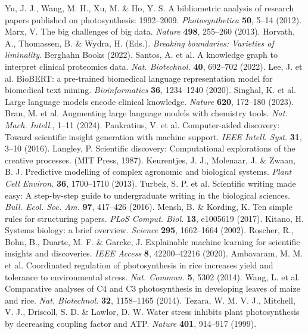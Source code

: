 \documentclass[12pt]{article}
\begin{document}
\begin{thebibliography}{39}
 Yu, J. J., Wang, M. H., Xu, M. \& Ho, Y. S. A bibliometric analysis of research papers published on photosynthesis: 1992--2009. \textit{Photosynthetica} \textbf{50}, 5--14 (2012).
 Marx, V. The big challenges of big data. \textit{Nature} \textbf{498}, 255--260 (2013).
 Horvath, A., Thomassen, B. \& Wydra, H. (Eds.). \textit{Breaking boundaries: Varieties of liminality}. Berghahn Books (2022).
 Santos, A. et al. A knowledge graph to interpret clinical proteomics data. \textit{Nat. Biotechnol.} \textbf{40}, 692--702 (2022).
 Lee, J. et al. BioBERT: a pre-trained biomedical language representation model for biomedical text mining. \textit{Bioinformatics} \textbf{36}, 1234--1240 (2020).
 Singhal, K. et al. Large language models encode clinical knowledge. \textit{Nature} \textbf{620}, 172--180 (2023).
 Bran, M. et al. Augmenting large language models with chemistry tools. \textit{Nat. Mach. Intell.}, 1--11 (2024).
 Pankratius, V. et al. Computer-aided discovery: Toward scientific insight generation with machine support. \textit{IEEE Intell. Syst.} \textbf{31}, 3--10 (2016).
 Langley, P. Scientific discovery: Computational explorations of the creative processes. (MIT Press, 1987).
 Keurentjes, J. J., Molenaar, J. \& Zwaan, B. J. Predictive modelling of complex agronomic and biological systems. \textit{Plant Cell Environ.} \textbf{36}, 1700--1710 (2013).
 Turbek, S. P. et al. Scientific writing made easy: A step-by-step guide to undergraduate writing in the biological sciences. \textit{Bull. Ecol. Soc. Am.} \textbf{97}, 417--426 (2016).
 Mensh, B. \& Kording, K. Ten simple rules for structuring papers. \textit{PLoS Comput. Biol.} \textbf{13}, e1005619 (2017).
 Kitano, H. Systems biology: a brief overview. \textit{Science} \textbf{295}, 1662--1664 (2002).
 Roscher, R., Bohn, B., Duarte, M. F. \& Garcke, J. Explainable machine learning for scientific insights and discoveries. \textit{IEEE Access} \textbf{8}, 42200--42216 (2020).
 Ambavaram, M. M. et al. Coordinated regulation of photosynthesis in rice increases yield and tolerance to environmental stress. \textit{Nat. Commun.} \textbf{5}, 5302 (2014).
 Wang, L. et al. Comparative analyses of C4 and C3 photosynthesis in developing leaves of maize and rice. \textit{Nat. Biotechnol.} \textbf{32}, 1158--1165 (2014).
 Tezara, W. M. V. J., Mitchell, V. J., Driscoll, S. D. \& Lawlor, D. W. Water stress inhibits plant photosynthesis by decreasing coupling factor and ATP. \textit{Nature} \textbf{401}, 914--917 (1999).

\end{thebibliography}
\end{document}
